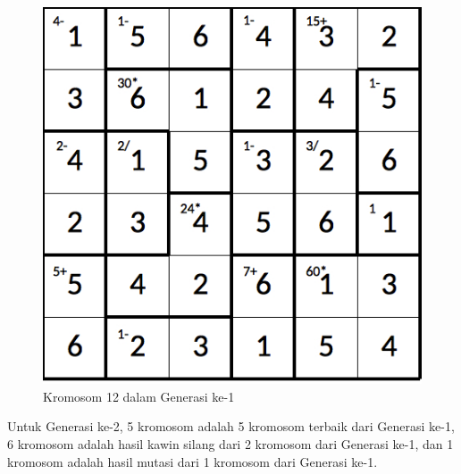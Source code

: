 \begin{figure}
\centering
\captionsetup{justification=centering}
\includegraphics[scale=0.333]{Gambar/hybridgenetic/Generation1Chromosome12}
\caption[Kromosom 12 dalam Generasi ke-1]{Kromosom 12 dalam Generasi ke-1}
\label{fig:analisisg1k12}
\end{figure}

\clearpage

Untuk Generasi ke-2, 5 kromosom adalah 5 kromosom terbaik dari Generasi ke-1, 6 kromosom adalah hasil kawin silang dari 2 kromosom dari Generasi ke-1, dan 1 kromosom adalah hasil mutasi dari 1 kromosom dari Generasi ke-1.


